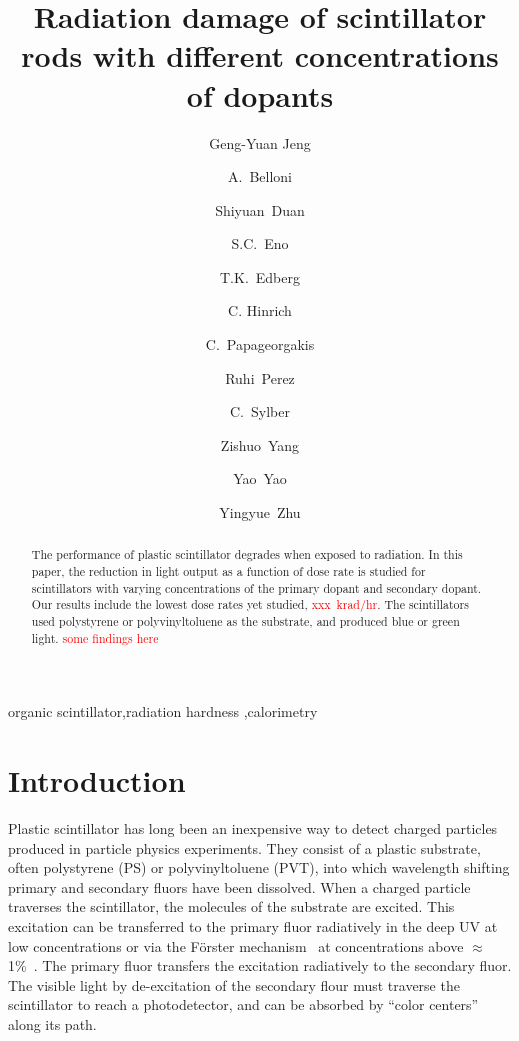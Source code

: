 \documentclass[review]{elsarticle}
\begin{document}
\begin{frontmatter}

\title{Radiation damage of scintillator rods with different concentrations of dopants
}


\author[umd]{Geng-Yuan Jeng}
\author[umd]{A.~Belloni}
\author[umd]{Shiyuan~Duan}
\author[umd]{S.C.~Eno}
\author[umd]{T.K.~Edberg}
\author[umd]{C. Hinrich}
\author[umd]{C.~Papageorgakis}
\author[umd]{Ruhi~Perez}
\author[umd]{C.~Sylber}
\author[umd]{Zishuo~Yang}
\author[umd]{Yao~Yao}
\author[umd]{Yingyue~Zhu}

\address[umd]{Dept. Physics, U. Maryland, College Park MD 30742 USA}



\begin{abstract}
The performance of plastic scintillator degrades when exposed to radiation. 
In this paper, the reduction in light output  as a function of dose rate
is studied for scintillators
with varying concentrations of the primary dopant and secondary dopant.
Our results include the lowest dose rates yet studied, \textcolor{red}{xxx~krad/hr}.
The scintillators used polystyrene or polyvinyltoluene as the substrate, and
produced blue or green light. \textcolor{red}{some findings here}
\end{abstract}

\begin{keyword}
organic scintillator\sep radiation hardness \sep calorimetry
\end{keyword}

\end{frontmatter}

\linenumbers

\section{Introduction}
Plastic scintillator has long been an inexpensive way to detect charged particles produced in particle physics experiments.
They consist of a plastic substrate, 
often polystyrene (PS) or polyvinyltoluene (PVT),
into which wavelength 
shifting primary and secondary fluors have been dissolved.
When a charged particle traverses the scintillator, the molecules of the substrate are excited.  
This excitation can be transferred to the primary fluor radiatively in the deep UV at low concentrations or via the F{\"o}rster 
mechanism~\cite{forster} at concentrations above $\approx$ 1\%~\cite{birks}.  
The primary fluor transfers the excitation radiatively to the secondary fluor.  
The visible light by de-excitation of the secondary flour
must traverse the scintillator to reach a photodetector, and can be absorbed by ``color centers'' along its path.
\end{document}
